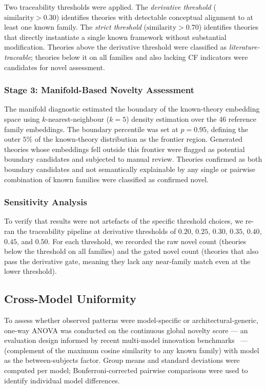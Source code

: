 \documentclass[pdflatex,sn-mathphys-num]{sn-jnl}
\begin{document}
Two traceability thresholds were applied.  The \emph{derivative threshold}
($\text{similarity} > 0.30$) identifies theories with detectable conceptual
alignment to at least one known family.  The \emph{strict threshold}
($\text{similarity} > 0.70$) identifies theories that directly instantiate a
single known framework without substantial modification.  Theories above the
derivative threshold were classified as \emph{literature-traceable}; theories
below it on all families and also lacking CF indicators were candidates for
novel assessment.

\subsubsection{Stage 3: Manifold-Based Novelty Assessment}

The manifold diagnostic estimated the boundary of the known-theory embedding
space using $k$-nearest-neighbour ($k=5$) density estimation over the 46
reference family embeddings.  The boundary percentile was set at $p=0.95$,
defining the outer $5\%$ of the known-theory distribution as the frontier
region.  Generated theories whose embeddings fell outside this frontier were
flagged as potential boundary candidates and subjected to manual review.
Theories confirmed as both boundary candidates and not semantically explainable
by any single or pairwise combination of known families were classified as
confirmed novel.

\subsubsection{Sensitivity Analysis}

To verify that results were not artefacts of the specific threshold choices, we
re-ran the traceability pipeline at derivative thresholds of $0.20$, $0.25$,
$0.30$, $0.35$, $0.40$, $0.45$, and $0.50$.  For each threshold, we recorded
the raw novel count (theories below the threshold on all families) and the
gated novel count (theories that also pass the derivative gate, meaning they
lack any near-family match even at the lower threshold).

\subsection{Cross-Model Uniformity}

To assess whether observed patterns were model-specific or architectural-generic,
one-way ANOVA was conducted on the continuous global novelty score
--- an evaluation design informed by recent multi-model innovation
benchmarks~\cite{zhang2026innogym} --- (complement
of the maximum cosine similarity to any known family) with model as the
between-subjects factor.  Group means and standard deviations were computed per
model; Bonferroni-corrected pairwise comparisons were used to identify
individual model differences.
\end{document}
